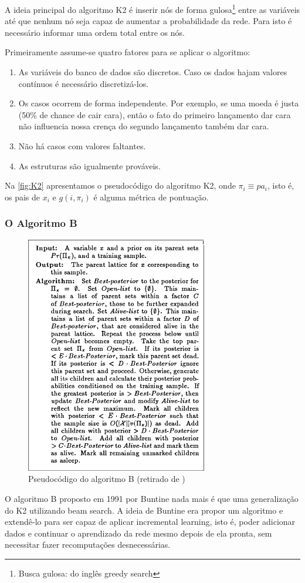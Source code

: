 A ideia principal do algoritmo K2 é inserir nós de forma gulosa\footnote{Busca gulosa: do inglês greedy search} entre as variáveis até que nenhum nó seja capaz de aumentar a probabilidade da rede. Para isto é necessário informar uma ordem total entre os nós.

Primeiramente assume-se quatro fatores para se aplicar o algoritmo:

\begin{enumerate}
	\item As variáveis do banco de dados são discretos. Caso os dados hajam valores contínuos é necessário discretizá-los. 
	
	\item Os casos ocorrem de forma independente. Por exemplo, se uma moeda é justa (50\% de chance de cair cara), então o fato do primeiro lançamento dar cara não influencia nossa crença do segundo lançamento também dar cara.
	
	\item Não há casos com valores faltantes.
	
	\item As estruturas são igualmente prováveis.
	
\end{enumerate}
Na \autoref{fig:K2} apresentamos o pseudocódigo do algoritmo K2, onde $\pi_i \equiv pa_i$, isto é, os pais de $x_i$  e $g(i, \pi_i)$ é alguma métrica de pontuação.

\subsubsection{O Algoritmo B}
\begin{figure}[htb]
	\centering
	\includegraphics[width = 300px]{figuras/B_Algorithm}
	\caption{Pseudocódigo do algoritmo B (retirado de \cite{buntine91})}
	\label{fig:B_algorithm}
\end{figure}
O algoritmo B proposto em 1991 por Buntine \cite{buntine91} nada mais é que uma generalização do K2 utilizando beam search. A ideia de Buntine era propor um algoritmo e extendê-lo para ser capaz de aplicar incremental learning, isto é, poder adicionar dados e continuar o aprendizado da rede mesmo depois de ela pronta, sem necessitar fazer recomputações desnecessárias.

